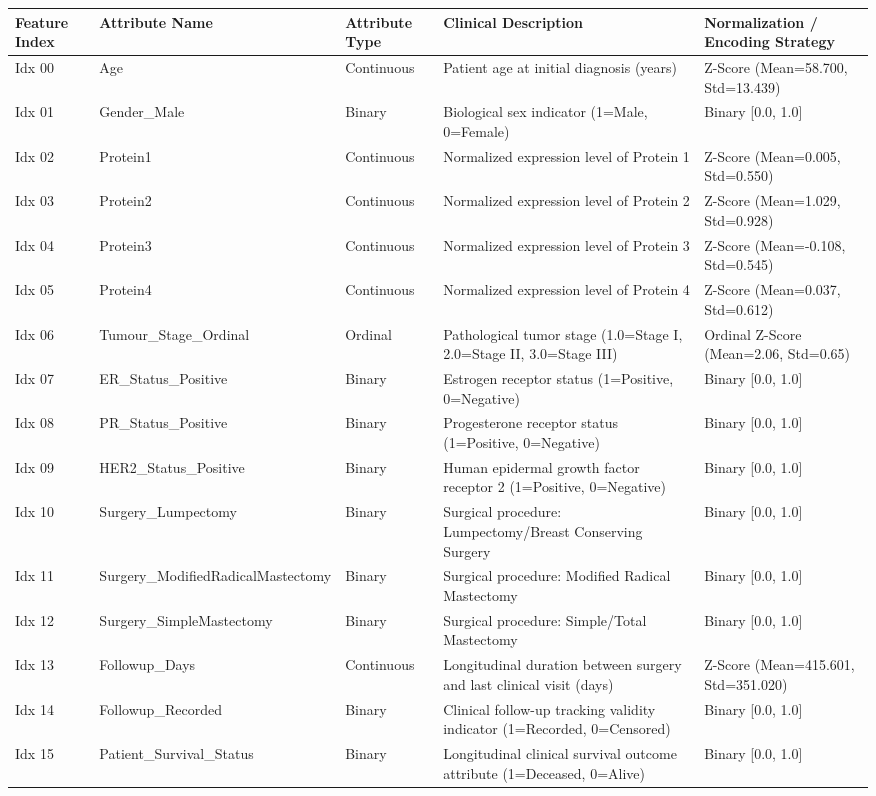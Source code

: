 \begin{tabular}{lllll}
\toprule
Feature Index & Attribute Name & Attribute Type & Clinical Description & Normalization / Encoding Strategy \\
\midrule
Idx 00 & Age & Continuous & Patient age at initial diagnosis (years) & Z-Score (Mean=58.700, Std=13.439) \\
Idx 01 & Gender\_Male & Binary & Biological sex indicator (1=Male, 0=Female) & Binary [0.0, 1.0] \\
Idx 02 & Protein1 & Continuous & Normalized expression level of Protein 1 & Z-Score (Mean=0.005, Std=0.550) \\
Idx 03 & Protein2 & Continuous & Normalized expression level of Protein 2 & Z-Score (Mean=1.029, Std=0.928) \\
Idx 04 & Protein3 & Continuous & Normalized expression level of Protein 3 & Z-Score (Mean=-0.108, Std=0.545) \\
Idx 05 & Protein4 & Continuous & Normalized expression level of Protein 4 & Z-Score (Mean=0.037, Std=0.612) \\
Idx 06 & Tumour\_Stage\_Ordinal & Ordinal & Pathological tumor stage (1.0=Stage I, 2.0=Stage II, 3.0=Stage III) & Ordinal Z-Score (Mean=2.06, Std=0.65) \\
Idx 07 & ER\_Status\_Positive & Binary & Estrogen receptor status (1=Positive, 0=Negative) & Binary [0.0, 1.0] \\
Idx 08 & PR\_Status\_Positive & Binary & Progesterone receptor status (1=Positive, 0=Negative) & Binary [0.0, 1.0] \\
Idx 09 & HER2\_Status\_Positive & Binary & Human epidermal growth factor receptor 2 (1=Positive, 0=Negative) & Binary [0.0, 1.0] \\
Idx 10 & Surgery\_Lumpectomy & Binary & Surgical procedure: Lumpectomy/Breast Conserving Surgery & Binary [0.0, 1.0] \\
Idx 11 & Surgery\_ModifiedRadicalMastectomy & Binary & Surgical procedure: Modified Radical Mastectomy & Binary [0.0, 1.0] \\
Idx 12 & Surgery\_SimpleMastectomy & Binary & Surgical procedure: Simple/Total Mastectomy & Binary [0.0, 1.0] \\
Idx 13 & Followup\_Days & Continuous & Longitudinal duration between surgery and last clinical visit (days) & Z-Score (Mean=415.601, Std=351.020) \\
Idx 14 & Followup\_Recorded & Binary & Clinical follow-up tracking validity indicator (1=Recorded, 0=Censored) & Binary [0.0, 1.0] \\
Idx 15 & Patient\_Survival\_Status & Binary & Longitudinal clinical survival outcome attribute (1=Deceased, 0=Alive) & Binary [0.0, 1.0] \\
\bottomrule
\end{tabular}
